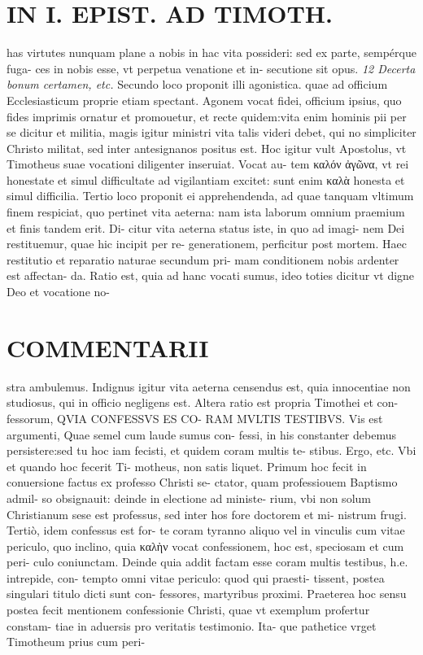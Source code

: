 \documentclass{article}
\begin{document}
\begin{pages}
\section*{IN I. EPIST. AD TIMOTH. }
\marginpar{[ p.161 ]}\pstart has virtutes nunquam plane a nobis in hac vita possideri: sed ex parte, sempérque fuga- ces in nobis esse, vt perpetua venatione et in- secutione sit opus.  \pend
\textit{12 Decerta bonum certamen, etc. }\pstart Secundo loco proponit illi agonistica. quae ad officium Ecclesiasticum proprie etiam spectant. Agonem vocat fidei, officium ipsius, quo fides imprimis ornatur et promouetur, et recte quidem:vita enim hominis pii per se dicitur et militia, magis igitur ministri vita talis videri debet, qui no simpliciter Christo militat, sed inter antesignanos positus est. Hoc igitur vult Apostolus, vt Timotheus suae vocationi diligenter inseruiat. Vocat au- tem καλόν ἀγῶνα, vt rei honestate et simul difficultate ad vigilantiam excitet: sunt enim καλὰ honesta et simul difficilia.  \pend\pstart Tertio loco proponit ei apprehendenda, ad quae tanquam vltimum finem respiciat, quo pertinet vita aeterna: nam ista laborum omnium praemium et finis tandem erit. Di- citur vita aeterna status iste, in quo ad imagi- nem Dei restituemur, quae hic incipit per re- generationem, perficitur post mortem. Haec restitutio et reparatio naturae secundum pri- mam conditionem nobis ardenter est affectan- da. Ratio est, quia ad hanc vocati sumus, ideo toties dicitur vt digne Deo et vocatione no-  \pend
\marginpar{[ p.162 ]}
\section*{COMMENTARII }\pstart stra ambulemus. Indignus igitur vita aeterna censendus est, quia innocentiae non studiosus, qui in officio negligens est.  \pend\pstart Altera ratio est propria Timothei et con- fessorum, QVIA CONFESSVS ES CO- RAM MVLTIS TESTIBVS. Vis est argumenti, Quae semel cum laude sumus con- fessi, in his constanter debemus persistere:sed tu hoc iam fecisti, et quidem coram multis te- stibus. Ergo, etc. Vbi et quando hoc fecerit Ti- motheus, non satis liquet. Primum hoc fecit in conuersione factus ex professo Christi se- ctator, quam professiouem Baptismo admil- so obsignauit: deinde in electione ad ministe- rium, vbi non solum Christianum sese est professus, sed inter hos fore doctorem et mi- nistrum frugi. Tertiò, idem confessus est for- te coram tyranno aliquo vel in vinculis cum vitae periculo, quo inclino, quia καλὴν vocat confessionem, hoc est, speciosam et cum peri- culo coniunctam. Deinde quia addit factam esse coram multis testibus, h.e. intrepide, con- tempto omni vitae periculo: quod qui praesti- tissent, postea singulari titulo dicti sunt con- fessores, martyribus proximi. Praeterea hoc sensu postea fecit mentionem confessionie Christi, quae vt exemplum profertur constam- tiae in aduersis pro veritatis testimonio. Ita- que pathetice vrget Timotheum prius cum peri-  \pend

\end{pages}
\end{document}
